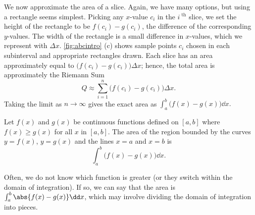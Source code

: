 We now approximate the area of a slice. Again, we have many options, but using a rectangle seems simplest. Picking any $x$-value $c_i$ in the $i^\text{ th}$ slice, we set the height of the rectangle to be $f(c_i)-g(c_i)$, the difference of the corresponding $y$-values. The width of the rectangle is a small difference in $x$-values, which we represent with $\Delta x$. \autoref{fig:abcintro} (c) shows sample points $c_i$ chosen in each subinterval and appropriate rectangles drawn.
Each slice has an area approximately equal to $\bigl(f(c_i)-g(c_i)\bigr)\Delta x$; hence, the total area is approximately the Riemann Sum\vspace{-.5\baselineskip}
\[Q \approx \sum_{i=1}^n \bigl(f(c_i)-g(c_i)\bigr)\Delta x.\]
Taking the limit as $n\to \infty$ gives the exact area as $\int_a^b \bigl(f(x)-g(x)\bigr)\dd x.$

\begin{theorem}\label{thm:areabetweencurves}
Let $f(x)$ and $g(x)$ be continuous functions defined on $[a,b]$ where $f(x)\geq g(x)$ for all $x$ in $[a,b]$. The area of the region bounded by the curves $y=f(x)$, $y=g(x)$ and the lines $x=a$ and $x=b$ is 
\[\int_a^b \bigl(f(x)-g(x)\bigr)\dd x.\]
\end{theorem}

Often, we do not know which function is greater (or they switch within the domain of integration).  If so, we can say that the area is $\int_a^b\abs{f(x)-g(x)}\dd x$, which may involve dividing the domain of integration into pieces.


